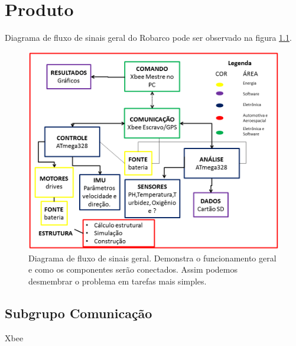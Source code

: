 \chapter[Produto]{Produto}


 Diagrama de fluxo de sinais geral do Robarco pode ser observado na figura \ref{fg1}.
 
 \begin{figure} [!htp]
 	\centering
 	\includegraphics[scale=0.7]{figuras/diagramaGERAL}
 	\caption{Diagrama de fluxo de sinais geral. Demonstra o funcionamento geral e como os componentes serão conectados. Assim podemos desmembrar o problema em tarefas mais simples.}
 	\label{fg1}
 \end{figure}

\section{Subgrupo Comunicação}
Xbee

